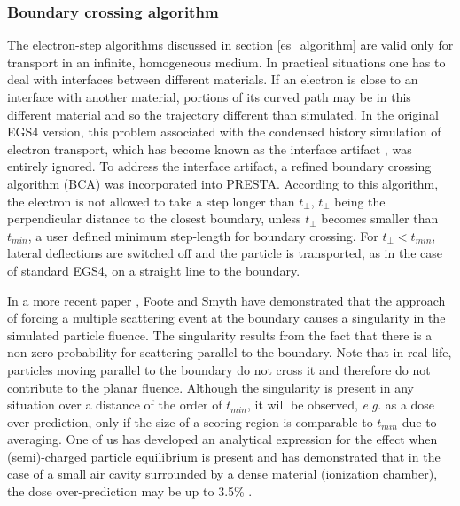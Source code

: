 
\subsubsection{Boundary crossing algorithm}
\label{BCA}
\setcounter{equation}{0}

The electron-step algorithms discussed in section 
\ref{es_algorithm} are valid only for transport in 
an infinite, homogeneous medium. In practical 
situations one has to deal with interfaces between 
different materials. If an electron is close 
to an interface with another material, portions 
of its curved path may be in this different material and 
so the trajectory different than simulated. 
In the original EGS4 version, this problem associated 
with the condensed history simulation of electron 
transport, which has become known as the interface artifact \cite{Bi85}, was 
entirely ignored. 
To address the interface artifact,
a refined boundary crossing algorithm (BCA) was 
incorporated into PRESTA. According to this algorithm, the electron 
is not allowed to take a step longer than $t_\perp$, $t_\perp$ being 
the perpendicular distance to the closest boundary, unless 
$t_\perp$ becomes smaller than $t_{min}$, a user defined 
minimum step-length for boundary crossing. For $t_\perp < t_{min}$, 
lateral deflections are switched off and the particle is transported, 
as in the case of standard EGS4, on a straight line to the 
boundary. 

In a more recent paper \cite{FS95}, Foote and Smyth have demonstrated 
that the approach of forcing a multiple scattering event at the 
boundary causes a singularity in the simulated particle fluence. 
The singularity results from the fact that there is a
non-zero probability for scattering parallel to the boundary. 
Note that in real life, particles moving parallel to the boundary do
not cross it and therefore do not contribute to the planar fluence. 
Although the singularity is present in any situation over a distance of the
order of $t_{min}$, it will be observed, {\em e.g.} as a dose
over-prediction, only if the
size of a scoring region is comparable to $t_{min}$ due to averaging. 
One of us has developed an analytical expression for 
the effect when (semi)-charged particle equilibrium is 
present and has demonstrated that in the case of a small air 
cavity surrounded by a dense material (ionization chamber), 
the dose over-prediction may be up to 3.5\% \cite{Ka99b}.

